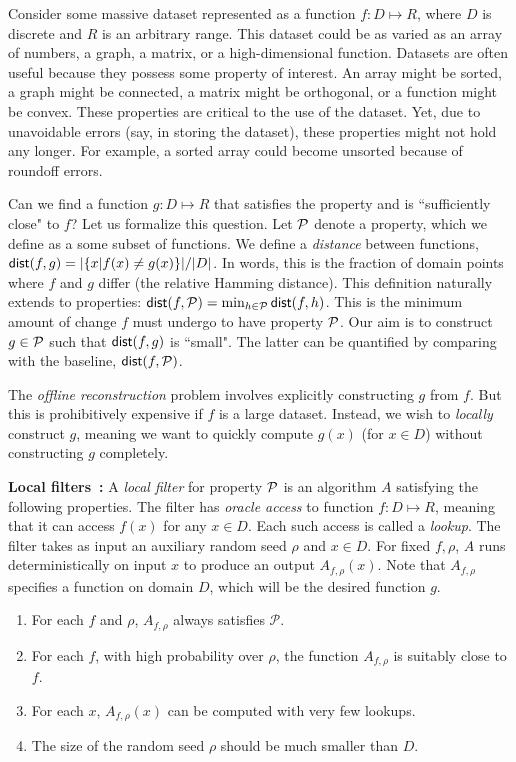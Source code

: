 \documentclass[natbib]{svcyclop}
\def\dist{{\sf dist}}
\begin{document}
\ProbDef

Consider some massive dataset represented as a function $f: D \mapsto R$,
where $D$ is discrete and $R$ is an arbitrary range.
This dataset could be as varied as an array of numbers, a graph, a matrix, or a high-dimensional function.
Datasets are often useful because they possess some 
property of interest. An array might be sorted, a graph might be 
connected, a matrix might be orthogonal, or a function might be convex. These properties are critical to the use
of the dataset. Yet, due to unavoidable errors (say, in storing the dataset), these
properties might not hold any longer. For example, a sorted array could become unsorted because of roundoff errors.

Can we find a function $g: D \mapsto R$ that satisfies the property and is ``sufficiently close"
to $f$? Let us formalize this question. Let $\mathcal{P}$ denote a property, which we define as a some subset
of functions. We define a \emph{distance} between functions, $\dist(f,g) = |\{x | f(x) \neq g(x)\}|/|D|$. In words, this is the fraction
of domain points where $f$ and $g$ differ (the relative Hamming distance). This definition naturally extends to properties:
$\dist(f,\cP) = \min_{h \in \cP} \dist(f,h)$. This is the minimum amount of change $f$ must undergo to have property $\mathcal{P}$.
Our aim is to construct $g \in \mathcal{P}$ such that $\dist(f,g)$ is ``small". The latter can be quantified
by comparing with the baseline, $\dist(f,\cP)$.


The \emph{offline reconstruction} problem involves explicitly constructing $g$ from $f$.
But this is prohibitively expensive if $f$ is a large dataset. Instead, we wish to \emph{locally} construct $g$,
meaning we want to quickly compute $g(x)$ (for $x \in D$) without constructing $g$ completely.

{\bf Local filters~\cite{SS06}:} A {\em local filter} for property ${\cal P}$
is an algorithm $A$ satisfying the following properties. The filter 
has \emph{oracle access} to function $f:D \mapsto R$, meaning that it can 
access $f(x)$ for any $x \in D$. Each such access is called a \emph{lookup}.
The filter takes
as input an auxiliary random seed $\rho$ and $x \in D$.  
For fixed $f, \rho$, $A$ runs deterministically on input $x$ to produce an output $A_{f,\rho}(x)$.
Note that $A_{f,\rho}$ specifies a function on domain $D$, which will be the desired function $g$.

\begin{enumerate}
\item \label{prop:1} For each $f$ and $\rho$,  $A_{f,\rho}$ 
always satisfies $\mathcal{P}$. 
\item \label{prop:2} For each $f$, with high probability over $\rho$, the function $A_{f,\rho}$ is suitably
close to $f$.
\item \label{prop:3} For each $x$, $A_{f,\rho}(x)$ can be computed with very few lookups.
\item \label{prop:4} The size of the random seed $\rho$ should be much smaller than $D$.
\end{enumerate}
\end{document}
